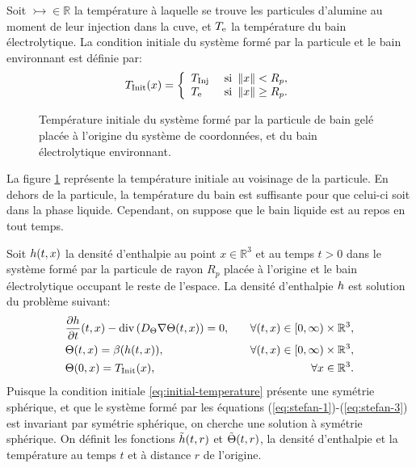 Soit $\tinj\in\mathbb R$ la température à laquelle se trouve les
particules d'alumine au moment de leur injection dans la cuve, et
$T_\mathrm{e}$ la température du bain électrolytique. La condition
initiale du système formé par la particule et le bain environnant est
définie par:
\begin{equation}
  T_\text{Init}(x) = \left\{
  \begin{array}{ll}
    T_\text{Inj} & \text{ si } \left\lVert x \right\rVert < R_p,\\
    T_\mathrm{e} & \text{ si } \left\lVert x \right\rVert \geq R_p.\\
  \end{array}
  \right.\label{eq:initial-temperature}
\end{equation}

\begin{figure}
  \begin{center}
    
    \caption{Température initiale du système formé par la
      particule de bain gelé placée à l'origine du système de
      coordonnées, et du bain électrolytique environnant.}
    \label{fig:particle-initial-temperature}
  \end{center}
\end{figure}
La figure \ref{fig:particle-initial-temperature} représente la
température initiale au voisinage de la particule. En dehors de la
particule, la température du bain est suffisante pour que celui-ci
soit dans la phase liquide. Cependant, on suppose que le bain liquide
est au repos en tout temps.

Soit $h(t, x)$ la densité d'enthalpie au point $x\in\mathbb
R^3$ et au temps $t > 0$ dans le système formé par la particule de
rayon $R_p$ placée à l'origine et le bain électrolytique
occupant le reste de l'espace. La densité d'enthalpie
$h$ est solution du problème suivant:
\begin{align}
  &\frac{\partial \enthalpydensity}{\partial t}(t,x) -\div %
  \parent{\electrolytetdiff\nabla \temperature(t, x)} = 0,& \quad %
  \forall (t, x) \in [0,\infty)\times \mathbb R^3,\label{eq:stefan-1}\\
  &\temperature(t, x) = \beta(\enthalpydensity(t, x)), & \quad %
  \forall (t, x) \in [0,\infty)\times \mathbb R^3,\label{eq:stefan-2}\\
    &\temperature(0, x) = \tinit(x),& \quad \forall x\in \mathbb R^3.\label{eq:stefan-3}
\end{align}
Puisque la condition initiale \ref{eq:initial-temperature} présente
une symétrie sphérique, et que le système formé par les équations
(\ref{eq:stefan-1})-(\ref{eq:stefan-3}) est invariant par symétrie
sphérique, on cherche une solution à symétrie sphérique. On définit
les fonctions $\tilde{h}(t, r)$ et $\tilde{\Theta}(t, r)$, la
densité d'enthalpie et la température au temps $t$ et à distance $r$
de l'origine.

